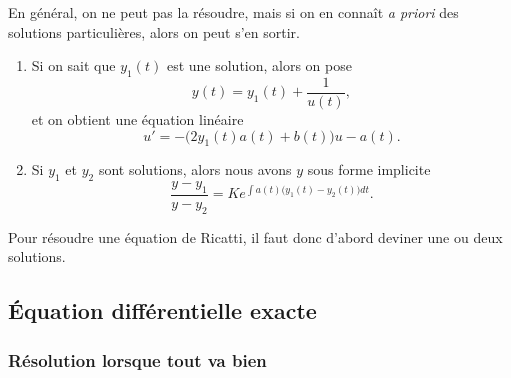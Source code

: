 En général, on ne peut pas la résoudre, mais si on en connaît \emph{a priori} des solutions particulières, alors on peut s'en sortir.

\begin{enumerate}

\item 
Si on sait que $y_1(t)$ est une solution, alors on pose
\begin{equation}
	y(t)=y_1(t)+\frac{1}{ u(t) },
\end{equation}
et on obtient une équation linéaire
\begin{equation}
	u'=-\big( 2y_1(t)a(t)+b(t) \big)u-a(t).
\end{equation}

\item
Si $y_1$ et $y_2$ sont solutions, alors nous avons $y$ sous forme implicite
\begin{equation}
	\frac{ y-y_1 }{ y-y_2 }=K e^{\int a(t)\big( y_1(t)-y_2(t) \big)dt}.
\end{equation}
\end{enumerate}

Pour résoudre une équation de Ricatti, il faut donc d'abord deviner une ou deux solutions.

					\subsection{Équation différentielle exacte}
\label{SubSecEqDiffExacte}

					\subsubsection{Résolution lorsque tout va bien}

